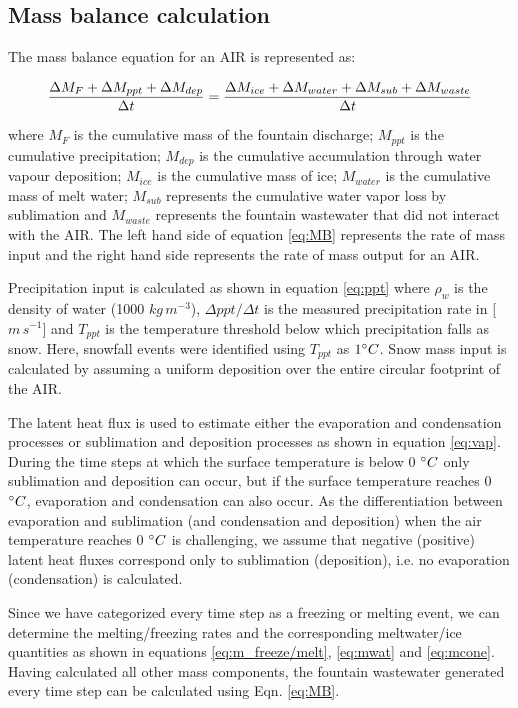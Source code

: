 \documentclass[utf8]{frontiersSCNS}
\begin{document}
\subsection{Mass balance calculation}

The mass balance equation for an AIR is represented as:

\begin{equation}
	\frac{\Delta M_{F} + \Delta M_{ppt} + \Delta M_{dep}}{\Delta t} = \frac{\Delta M_{ice} +\Delta M_{water} +
		\Delta M_{sub} + \Delta M_{waste}}{\Delta t}  \\
	\label{eq:MB}
\end{equation}

where $M_{F}$ is the cumulative mass of the fountain discharge; $M_{ppt}$ is the cumulative precipitation;  $M_{dep}$ is the cumulative
accumulation through water vapour deposition; $M_{ice}$ is the cumulative mass of ice; $M_{water}$ is the cumulative
mass of melt water; $M_{sub}$ represents the cumulative water vapor loss by sublimation and $M_{waste}$ represents the
fountain wastewater that did not interact with the AIR. The left hand side of equation \ref{eq:MB} represents the rate of
mass input and the right hand side represents the rate of mass output for an AIR.

Precipitation input is calculated as shown in equation \ref{eq:ppt} where $\rho_{w}$ is the density of water (1000
$kg\,m^{-3}$), $\Delta ppt/ \Delta t$ is the measured precipitation rate in [$m\,s^{-1}$] and $T_{ppt}$ is the temperature threshold
below which precipitation falls as snow. Here, snowfall events were identified using $T_{ppt}$ as $1 \degree C$. Snow
mass input is calculated by assuming a uniform deposition over the entire circular footprint of the AIR.

The latent heat flux is used to estimate either the evaporation and condensation processes or sublimation and deposition
processes as shown in equation \ref{eq:vap}. During the time steps at which the surface temperature is below 0 $\degree C$ only
sublimation and deposition can occur, but if the surface temperature reaches 0 $\degree C$, evaporation and condensation
can also occur. As the differentiation between evaporation and sublimation (and condensation and deposition) when the
air temperature reaches 0 $\degree C$ is challenging, we assume that negative (positive) latent heat fluxes correspond
only to sublimation (deposition), i.e. no evaporation (condensation) is calculated.

Since we have categorized every time step as a freezing or melting event, we can determine the melting/freezing
rates and the corresponding meltwater/ice quantities as shown in equations \ref{eq:m_freeze/melt}, \ref{eq:mwat}
and \ref{eq:mcone}. Having calculated all other mass components, the fountain wastewater generated every
time step can be calculated using Eqn. \ref{eq:MB}.
\end{document}

